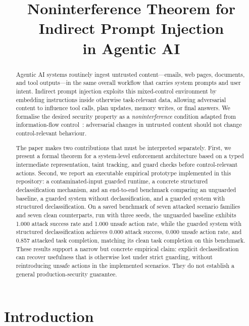 \documentclass[11pt]{article}
\title{Noninterference Theorem for Indirect Prompt Injection\\in Agentic AI}
\author{}
\date{}
\begin{document}
\maketitle

\begin{abstract}
Agentic AI systems routinely ingest untrusted content---emails, web pages,
documents, and tool outputs---in the same overall workflow that carries system
prompts and user intent. Indirect prompt injection exploits this mixed-control
environment by embedding instructions inside otherwise task-relevant data,
allowing adversarial content to influence tool calls, plan updates, memory
writes, or final answers. We formalise the desired security property as a
\emph{noninterference} condition adapted from information-flow
control~\cite{goguen1982}: adversarial changes in untrusted content should not
change control-relevant behaviour.

The paper makes two contributions that must be interpreted separately. First,
we present a formal theorem for a system-level enforcement architecture based on
a typed intermediate representation, taint tracking, and guard checks before
control-relevant actions. Second, we report an executable empirical prototype
implemented in this repository: a contaminated-input guarded runtime, a concrete
structured declassification mechanism, and an end-to-end benchmark comparing an
unguarded baseline, a guarded system without declassification, and a guarded
system with structured declassification. On a saved benchmark of seven attacked
scenario families and seven clean counterparts, run with three seeds, the
unguarded baseline exhibits 1.000 attack success rate and 1.000 unsafe action
rate, while the guarded system with structured declassification achieves 0.000
attack success, 0.000 unsafe action rate, and 0.857 attacked task completion,
matching its clean task completion on this benchmark. These results support a
narrow but concrete empirical claim: explicit declassification can recover
usefulness that is otherwise lost under strict guarding, without reintroducing
unsafe actions in the implemented scenarios. They do not establish a general
production-security guarantee.
\end{abstract}

\section{Introduction}\label{sec:intro}
\end{document}
